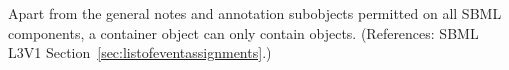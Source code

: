 Apart from the general notes and annotation subobjects permitted on all
SBML components, a \ListOfEventAssignments container object can only
contain \EventAssignment objects.  (References: SBML L3V1
Section~\ref{sec:listofeventassignments}.)
